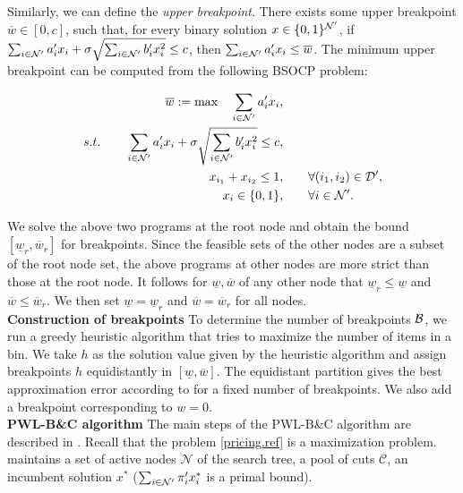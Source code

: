 Similarly, we can define the \textit{upper breakpoint}.
There exists some upper breakpoint \(\overline{w} \in [0,c]\), such that, for every binary solution \(x \in \{0,1\}^{\mathcal N'}\), if \(\sum_{i \in \mathcal N'} a'_i x_i  + \sigma\sqrt{\sum_{i\in \mathcal N'} b'_i x_i^2 } \le c\), then \( \sum_{i \in \mathcal N'} a'_i x_i  \le \overline{w} \). The minimum upper breakpoint can be computed from the following BSOCP problem:

 \begin{equation}
 \label{bdt.ym}
\begin{split}
   	 \overline{w}:= \max \quad \sum_{i\in \mathcal N'}a'_i x_i , \qquad& \\
    s.t. \qquad  \sum_{i \in \mathcal N'} a'_i x_i  + \sigma\sqrt{\sum_{i\in \mathcal N'} b'_i x_i^2 } \le c,\qquad& \\
    x_{i_1} + x_{i_2} \le 1, \qquad & \forall (i_1, i_2) \in \mathcal D', \\
    x_i \in \{0,1\},\qquad & \forall  i  \in \mathcal N'.
\end{split}
\end{equation}

We solve the above two programs at the root node and obtain the bound \([\underline{w}_r, \overline{w}_r]\) for breakpoints. Since the feasible sets of the other nodes are a subset of the root node set, the above programs at other nodes are more strict than those at the root node. It follows for $\underline{w}, \overline{w}$ of any other node that \(\underline{w}_r \le \underline{w}\) and \( \overline{w} \le \overline{w}_r\). We then set $\underline{w} = \underline{w}_r$ and $\overline{w} = \overline{w}_r$ for all nodes.\\

\textbf{Construction of breakpoints} To determine the number of breakpoints \(\mathcal B\), we run a greedy heuristic algorithm that tries to maximize the number of items in a bin. We take $h$ as the solution value given by the heuristic algorithm and assign breakpoints \(h\) equidistantly in \([\underline{w}, \overline{w}]\). The equidistant partition gives the best approximation error according to  for a fixed number of breakpoints. We also add a breakpoint corresponding to $w=0$.\\


 
 \textbf{PWL-B\&C algorithm} The main steps of the PWL-B\&C algorithm are described in . Recall that the problem \eqref{pricing.ref} is a maximization problem.  maintains  a set of active nodes $\mathscr{N}$ of the search tree, a pool of cuts \(\mathscr{C}\),  an incumbent solution $x^\ast$ ($\sum_{i \in \mathcal N'}\pi'_ix^\ast_i$ is a primal bound).
 
